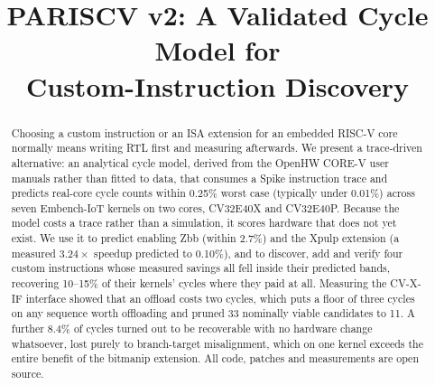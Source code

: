 \documentclass[conference,10pt]{IEEEtran}
\begin{document}
\title{PARISCV v2: A Validated Cycle Model for\\
Custom-Instruction Discovery}

\author{
}

%

\maketitle

\begin{abstract}
Choosing a custom instruction or an ISA extension for an embedded RISC-V core
normally means writing RTL first and measuring afterwards. We present a
trace-driven alternative: an analytical cycle model, derived from the OpenHW
CORE-V user manuals rather than fitted to data, that consumes a Spike
instruction trace and predicts real-core cycle counts within 0.25\%
worst case (typically under 0.01\%) across seven Embench-IoT kernels on two
cores, CV32E40X and CV32E40P. Because the model costs a trace rather than a
simulation, it scores hardware that does not yet exist. We use it to predict
enabling Zbb (within 2.7\%) and the Xpulp extension (a measured
$3.24\times$ speedup predicted to 0.10\%), and to discover, add and verify four
custom instructions whose measured savings all fell inside their predicted
bands, recovering 10--15\% of their kernels' cycles where they paid at all.
Measuring the CV-X-IF interface showed that an offload costs two cycles, which
puts a floor of three cycles on any sequence worth offloading and pruned 33
nominally viable candidates to 11. A further 8.4\% of cycles turned out to be
recoverable with no hardware change whatsoever, lost purely to branch-target
misalignment, which on one kernel exceeds the entire benefit of the bitmanip
extension. All code, patches and measurements are open source.
\end{abstract}
\end{document}
